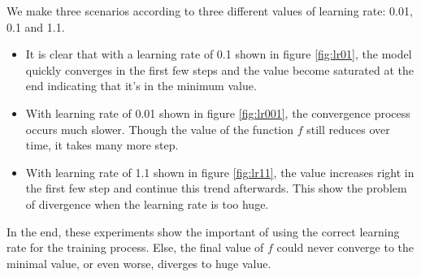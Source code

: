 \documentclass{article}
\begin{document}
We make three scenarios according to three different values of learning rate: 0.01, 0.1 and 1.1.
\begin{itemize}
    \item It is clear that with a learning rate of 0.1 shown in figure \ref{fig:lr01}, the model quickly converges in the first few steps and the value become saturated at the end indicating that it's in the minimum value.
    \item With learning rate of 0.01 shown in figure \ref{fig:lr001}, the convergence process occurs much slower. Though the value of the function $f$ still reduces over time, it takes many more step.
    \item With learning rate of 1.1 shown in figure \ref{fig:lr11}, the value increases right in the first few step and continue this trend afterwards. This show the problem of divergence when the learning rate is too huge. 
\end{itemize}
In the end, these experiments show the important of using the correct learning rate for the training process. Else, the final value of $f$ could never converge to the minimal value, or even worse, diverges to huge value.
\end{document}
